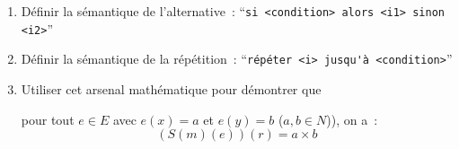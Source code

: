 \begin{exercice}
\begin{enumerate}
\item Définir la sémantique de l'alternative~:
``\verb/si <condition> alors <i1> sinon <i2>/''
\item Définir la sémantique de la répétition~:
     ``\verb/répéter <i> jusqu'à <condition>/''
\item Utiliser cet arsenal mathématique pour démontrer que 

    pour tout $e \in E$  avec $e(x)=a$ et $e(y)=b$  ($a,b \in N$)), on a~: 
$$ (S(m)(e))(r) = a \times b$$    
\end{enumerate}
\end{exercice}


